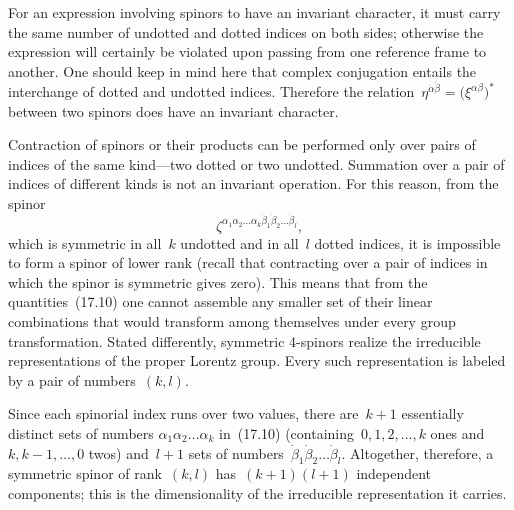 For an expression involving spinors to have an invariant character, it must carry the same number of undotted and dotted indices on both sides; otherwise the expression will certainly be violated upon passing from one reference frame to another. One should keep in mind here that complex conjugation entails the interchange of dotted and undotted indices. Therefore the relation~$\eta^{\dot\alpha\dot\beta} = \bigl(\xi^{\alpha\beta}\bigr)^*$ between two spinors does have an invariant character.

Contraction of spinors or their products can be performed only over pairs of indices of the same kind---two dotted or two undotted. Summation over a pair of indices of different kinds is not an invariant operation. For this reason, from the spinor
\begin{equation}
\zeta^{\alpha_1\alpha_2\ldots\alpha_k\dot\beta_1\dot\beta_2\ldots\dot\beta_l},
\tag{17.10}
\end{equation}
which is symmetric in all~$k$ undotted and in all~$l$ dotted indices, it is impossible to form a spinor of lower rank (recall that contracting over a pair of indices in which the spinor is symmetric gives zero). This means that from the quantities~(17.10) one cannot assemble any smaller set of their linear combinations that would transform among themselves under every group transformation. Stated differently, symmetric 4-spinors realize the irreducible representations of the proper Lorentz group. Every such representation is labeled by a pair of numbers~$(k, l)$.

Since each spinorial index runs over two values, there are~$k + 1$ essentially distinct sets of numbers $\alpha_1\alpha_2\ldots\alpha_k$ in~(17.10) (containing~$0, 1, 2, \ldots, k$ ones and $k, k-1, \ldots, 0$ twos) and~$l + 1$ sets of numbers~$\dot\beta_1\dot\beta_2\ldots\dot\beta_l$. Altogether, therefore, a symmetric spinor of rank~$(k, l)$ has~$(k+1)(l+1)$ independent components; this is the dimensionality of the irreducible representation it carries.
